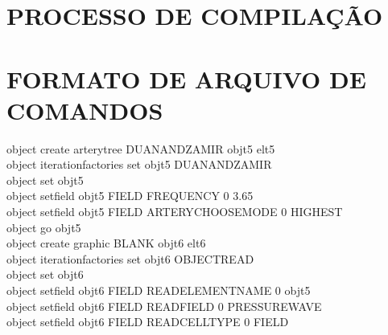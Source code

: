 \documentclass[a4paper,12pt]{monografia}
\theoremstyle{plain}
\theoremstyle{definition}
\theoremstyle{remark}
\begin{document}
\begin{appendices}
	\chapter{PROCESSO DE COMPILAÇÃO}\label{annex1}
	
	
	\chapter{FORMATO DE ARQUIVO DE COMANDOS}\label{annex2}
	
\begin{algorithm}[H]
	\SetAlgoLined
		object create artery\underline{\space\space}tree DUAN\underline{\space\space}AND\underline{\space\space}ZAMIR obj\underline{\space\space}t5 el\underline{\space\space}t5 \\
		object iteration\underline{\space\space}factories set obj\underline{\space\space}t5 DUAN\underline{\space\space}AND\underline{\space\space}ZAMIR \\
		object set obj\underline{\space\space}t5 \\
		object set\underline{\space\space}field obj\underline{\space\space}t5 FIELD FREQUENCY 0 3.65 \\
		object set\underline{\space\space}field obj\underline{\space\space}t5 FIELD ARTERY\underline{\space\space}CHOOSE\underline{\space\space}MODE 0 HIGHEST \\
		object go obj\underline{\space\space}t5 \\
		object create graphic BLANK obj\underline{\space\space}t6 el\underline{\space\space}t6 \\
		object iteration\underline{\space\space}factories set obj\underline{\space\space}t6 OBJECT\underline{\space\space}READ \\
		object set obj\underline{\space\space}t6 \\
		object set\underline{\space\space}field obj\underline{\space\space}t6 FIELD READ\underline{\space\space}ELEMENT\underline{\space\space}NAME 0 obj\underline{\space\space}t5 \\
		object set\underline{\space\space}field obj\underline{\space\space}t6 FIELD READ\underline{\space\space}FIELD 0 PRESSURE\underline{\space\space}WAVE \\
		object set\underline{\space\space}field obj\underline{\space\space}t6 FIELD READ\underline{\space\space}CELL\underline{\space\space}TYPE 0 FIELD \\

\end{algorithm}
\end{appendices}
\end{document}

